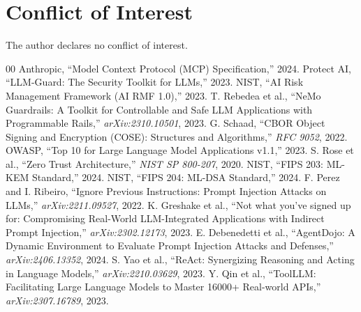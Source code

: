 \documentclass[conference]{IEEEtran}
\begin{document}
\section*{Conflict of Interest}
The author declares no conflict of interest.


\begin{thebibliography}{00}
 Anthropic, ``Model Context Protocol (MCP) Specification,'' 2024.
 Protect AI, ``LLM-Guard: The Security Toolkit for LLMs,'' 2023.
 NIST, ``AI Risk Management Framework (AI RMF 1.0),'' 2023.
 T. Rebedea et al., ``NeMo Guardrails: A Toolkit for Controllable and Safe LLM Applications with Programmable Rails,'' \textit{arXiv:2310.10501}, 2023.
 G. Schaad, ``CBOR Object Signing and Encryption (COSE): Structures and Algorithms,'' \textit{RFC 9052}, 2022.
 OWASP, ``Top 10 for Large Language Model Applications v1.1,'' 2023.
 S. Rose et al., ``Zero Trust Architecture,'' \textit{NIST SP 800-207}, 2020.
 NIST, ``FIPS 203: ML-KEM Standard,'' 2024.
 NIST, ``FIPS 204: ML-DSA Standard,'' 2024.
 F. Perez and I. Ribeiro, ``Ignore Previous Instructions: Prompt Injection Attacks on LLMs,'' \textit{arXiv:2211.09527}, 2022.
 K. Greshake et al., ``Not what you've signed up for: Compromising Real-World LLM-Integrated Applications with Indirect Prompt Injection,'' \textit{arXiv:2302.12173}, 2023.
 E. Debenedetti et al., ``AgentDojo: A Dynamic Environment to Evaluate Prompt Injection Attacks and Defenses,'' \textit{arXiv:2406.13352}, 2024.
 S. Yao et al., ``ReAct: Synergizing Reasoning and Acting in Language Models,'' \textit{arXiv:2210.03629}, 2023.
 Y. Qin et al., ``ToolLLM: Facilitating Large Language Models to Master 16000+ Real-world APIs,'' \textit{arXiv:2307.16789}, 2023.
\end{thebibliography}
\end{document}
